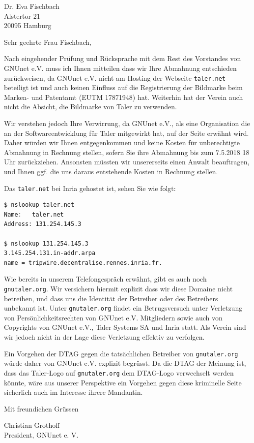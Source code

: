 \documentclass[DIN, pagenumber=false, parskip=half,
               fromalign=right, fromphone=false, fromfax=false, frombank=true,
               yourmail=false,
               yourref=false,
               fromrule=false]{scrlttr2}
\begin{document}
\begin{letter}{
        Dr. Eva Fischbach \\
	Alstertor 21 \\
        20095 Hamburg
}

\opening{Sehr geehrte Frau Fischbach,}

Nach eingehender Pr\"ufung und R\"ucksprache mit dem Rest des
Vorstandes von GNUnet e.V. muss ich Ihnen mitteilen dass wir Ihre
Abmahnung entschieden zur\"uckweisen, da GNUnet e.V. nicht am Hosting
der Webseite \texttt{taler.net} beteiligt ist und auch keinen
Einfluss auf die Registrierung der Bildmarke beim Marken- und Patentamt
(EUTM 17871948) hat.  Weiterhin hat der Verein auch nicht die Absicht,
die Bildmarke von Taler zu verwenden.

Wir verstehen jedoch Ihre Verwirrung, da GNUnet e.V., als eine
Organisation die an der Softwareentwicklung f\"ur Taler mitgewirkt hat,
auf der Seite erw\"ahnt wird. Daher w\"urden wir Ihnen
entgegenkommen und keine Kosten f\"ur unberechtigte Abmahnung
in Rechnung stellen, sofern Sie ihre Abmahnung bis zum 7.5.2018 18 Uhr
zur\"uckziehen.  Ansonsten m\"ussten wir unsererseits einen Anwalt
beauftragen, und Ihnen ggf. die uns daraus entstehende Kosten in
Rechnung stellen.

Das \texttt{taler.net} bei Inria gehostet ist, sehen Sie
wie folgt:
\begin{verbatim}
$ nslookup taler.net
Name:	taler.net
Address: 131.254.145.3

$ nslookup 131.254.145.3
3.145.254.131.in-addr.arpa
name = tripwire.decentralise.rennes.inria.fr.
\end{verbatim}

Wie bereits in unserem Telefongespr\"ach erw\"ahnt, gibt es auch noch
\texttt{gnutaler.org}.  Wir versichern hiermit explizit dass wir diese
Domaine nicht betreiben, und dass uns die Identit\"at der Betreiber
oder des Betreibers unbekannt ist.  Unter \texttt{gnutaler.org} findet
ein Betrugsversuch unter Verletzung von Pers\"onlichkeitsrechten von
GNUnet e.V. Mitgliedern sowie auch von Copyrights von GNUnet e.V.,
Taler Systems SA und Inria statt.  Als Verein sind wir jedoch nicht in
der Lage diese Verletzung effektiv zu verfolgen.

Ein Vorgehen der DTAG gegen die tats\"achlichen Betreiber von
\texttt{gnutaler.org} w\"urde daher von GNUnet e.V. explizit
begr\"usst.  Da die DTAG der Meinung ist, dass das Taler-Logo auf
\texttt{gnutaler.org} dem DTAG-Logo verwechselt werden k\"onnte,
w\"are aus unserer Perspektive ein Vorgehen gegen diese kriminelle
Seite sicherlich auch im Interesse ihrere Mandantin.


Mit freundichen Gr\"ussen

\vspace{3cm}
Christian Grothoff\\
President, GNUnet e. V.


\end{letter}
\end{document}
